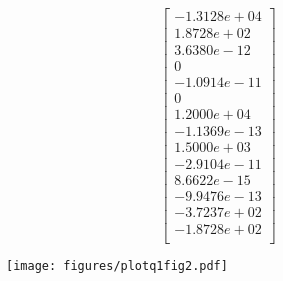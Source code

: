 \documentclass{article}
\begin{document}
\[
    \begin{bmatrix}
         -1.3128e+04 \\
   1.8728e+02 \\
   3.6380e-12 \\
            0 \\
  -1.0914e-11 \\
            0 \\
   1.2000e+04 \\
  -1.1369e-13 \\
   1.5000e+03 \\
  -2.9104e-11 \\
   8.6622e-15 \\
  -9.9476e-13 \\
  -3.7237e+02 \\
  -1.8728e+02 \\
    \end{bmatrix}
\]
\begin{figure}
        \texttt{[image: figures/plotq1fig2.pdf]}
\end{figure}
\end{document}
